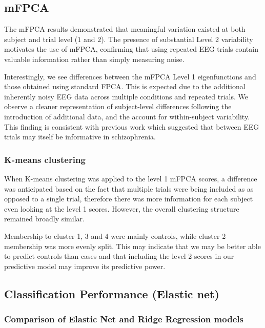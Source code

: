 \documentclass{article}
\begin{document}
\subsection{mFPCA}\label{mfpca}

The mFPCA results demonstrated that meaningful variation existed at both
subject and trial level (\(1\) and \(2\)). The presence of substantial
Level 2 variability motivates the use of mFPCA, confirming that using
repeated EEG trials contain valuable information rather than simply
measuring noise.

Interestingly, we see differences between the mFPCA Level 1
eigenfunctions and those obtained using standard FPCA. This is expected
due to the additional inherently noisy EEG data across multiple
conditions and repeated trials. We observe a cleaner representation of
subject-level differences following the introduction of additional data,
and the account for within-subject variability. This finding is
consistent with previous work which suggested that between EEG trials
may itself be informative in schizophrenia.

\subsubsection{K-means clustering}\label{k-means-clustering-2}

When K-means clustering was applied to the level 1 mFPCA scores, a
difference was anticipated based on the fact that multiple trials were
being included as as opposed to a single trial, therefore there was more
information for each subject even looking at the level 1 scores.
However, the overall clustering structure remained broadly similar.

Membership to cluster 1, 3 and 4 were mainly controls, while cluster 2
membership was more evenly split. This may indicate that we may be
better able to predict controls than cases and that including the level
2 scores in our predictive model may improve its predictive power.

\subsection{Classification Performance (Elastic
net)}\label{classification-performance-elastic-net}

\subsubsection{Comparison of Elastic Net and Ridge Regression
models}\label{comparison-of-elastic-net-and-ridge-regression-models}
\end{document}
